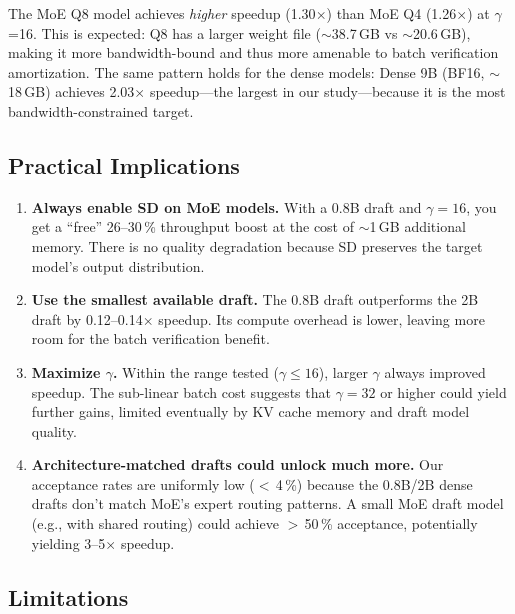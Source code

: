 \documentclass[11pt,a4paper]{article}
\begin{document}
The MoE Q8 model achieves \emph{higher} speedup (1.30$\times$) than MoE Q4 (1.26$\times$) at $\gamma$=16. This is expected: Q8 has a larger weight file ($\sim$38.7\,GB vs $\sim$20.6\,GB), making it more bandwidth-bound and thus more amenable to batch verification amortization. The same pattern holds for the dense models: Dense 9B (BF16, $\sim$18\,GB) achieves 2.03$\times$ speedup---the largest in our study---because it is the most bandwidth-constrained target.

\subsection{Practical Implications}

\begin{enumerate}[nosep,leftmargin=*]
  \item \textbf{Always enable SD on MoE models.} With a 0.8B draft and $\gamma=16$, you get a ``free'' 26--30\,\% throughput boost at the cost of $\sim$1\,GB additional memory. There is no quality degradation because SD preserves the target model's output distribution.

  \item \textbf{Use the smallest available draft.} The 0.8B draft outperforms the 2B draft by 0.12--0.14$\times$ speedup. Its compute overhead is lower, leaving more room for the batch verification benefit.

  \item \textbf{Maximize $\gamma$.} Within the range tested ($\gamma \leq 16$), larger $\gamma$ always improved speedup. The sub-linear batch cost suggests that $\gamma = 32$ or higher could yield further gains, limited eventually by KV cache memory and draft model quality.

  \item \textbf{Architecture-matched drafts could unlock much more.} Our acceptance rates are uniformly low ($<$\,4\,\%) because the 0.8B/2B dense drafts don't match MoE's expert routing patterns. A small MoE draft model (e.g., with shared routing) could achieve $>$\,50\,\% acceptance, potentially yielding 3--5$\times$ speedup.
\end{enumerate}

\subsection{Limitations}
\end{document}
